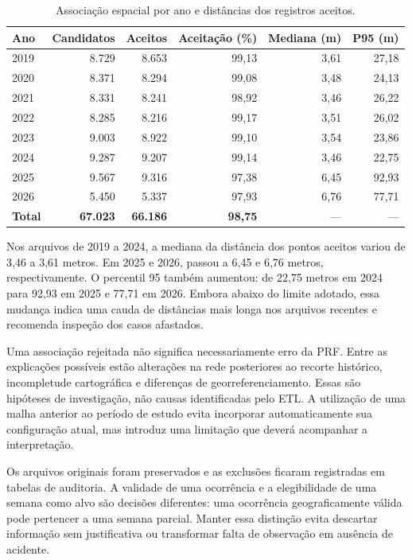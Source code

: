 \documentclass[12pt]{article}
\begin{document}
\begin{table}[!ht]
\centering
\caption{Associação espacial por ano e distâncias dos registros aceitos.}
\label{tab:etl-associacao}
\small
\setlength{\tabcolsep}{5pt}
\begin{tabular}{lrrrrr}
  \toprule
  \textbf{Ano} & \textbf{Candidatos} & \textbf{Aceitos} &
  \textbf{Aceitação (\%)} & \textbf{Mediana (m)} & \textbf{P95 (m)} \\
\midrule
2019 & 8.729 & 8.653 & 99,13 & 3,61 & 27,18 \\
2020 & 8.371 & 8.294 & 99,08 & 3,48 & 24,13 \\
2021 & 8.331 & 8.241 & 98,92 & 3,46 & 26,22 \\
2022 & 8.285 & 8.216 & 99,17 & 3,51 & 26,02 \\
2023 & 9.003 & 8.922 & 99,10 & 3,54 & 23,86 \\
2024 & 9.287 & 9.207 & 99,14 & 3,46 & 22,75 \\
2025 & 9.567 & 9.316 & 97,38 & 6,45 & 92,93 \\
2026 & 5.450 & 5.337 & 97,93 & 6,76 & 77,71 \\
\midrule
  \textbf{Total} & \textbf{67.023} & \textbf{66.186} & \textbf{98,75} & --- & --- \\
\bottomrule
\end{tabular}
\end{table}

Nos arquivos de 2019 a 2024, a mediana da distância dos pontos aceitos
variou de 3,46 a 3,61 metros. Em 2025 e 2026, passou a 6,45 e 6,76
metros, respectivamente. O percentil 95 também aumentou: de 22,75
metros em 2024 para 92,93 em 2025 e 77,71 em 2026. Embora abaixo do
limite adotado, essa mudança indica uma cauda de distâncias mais longa
nos arquivos recentes e recomenda inspeção dos casos afastados.

Uma associação rejeitada não significa necessariamente erro da PRF.
Entre as explicações possíveis estão alterações na rede posteriores ao
recorte histórico, incompletude cartográfica e diferenças de
georreferenciamento. Essas são hipóteses de investigação, não causas
identificadas pelo ETL. A utilização de uma malha anterior ao período
de estudo evita incorporar automaticamente sua configuração atual,
mas introduz uma limitação que deverá acompanhar a interpretação.

Os arquivos originais foram preservados e as exclusões ficaram
registradas em tabelas de auditoria. A validade de uma ocorrência e a
elegibilidade de uma semana como alvo são decisões diferentes: uma
ocorrência geograficamente válida pode pertencer a uma semana parcial.
Manter essa distinção evita descartar informação sem justificativa ou
transformar falta de observação em ausência de acidente.
\end{document}
